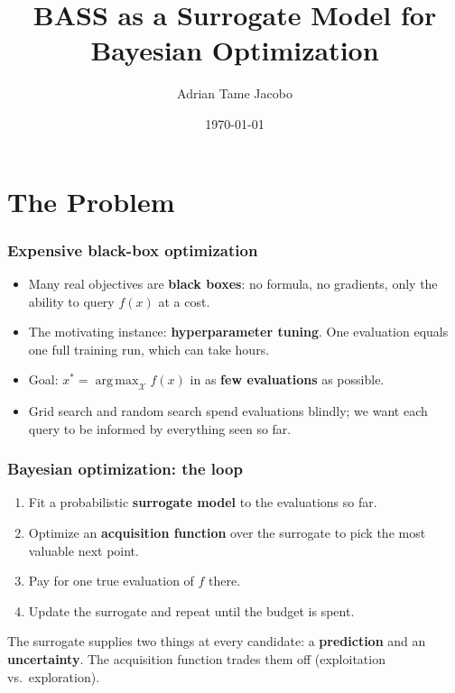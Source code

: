 \documentclass[fleqn]{beamer}
\title{BASS as a Surrogate Model for Bayesian Optimization}
\author{Adrian Tame Jacobo}
\institute[Instituto Tecnológico Autónomo de México]{Thesis Defense}
\date{\today}
\DeclareMathOperator*{\argmax}{arg\,max}
\begin{document}
\begin{frame}
  \titlepage
\end{frame}

\section{The Problem}

\begin{frame}
  \frametitle{Expensive black-box optimization}
  \begin{itemize}
    \item Many real objectives are \textbf{black boxes}: no formula, no gradients, only the ability to query $f(x)$ at a cost.
    \item The motivating instance: \textbf{hyperparameter tuning}. One evaluation equals one full training run, which can take hours.
    \item Goal: $x^* = \argmax_{\mathcal{X}} f(x)$ in as \textbf{few evaluations} as possible.
    \item Grid search and random search spend evaluations blindly; we want each query to be informed by everything seen so far.
  \end{itemize}
\end{frame}

\begin{frame}
  \frametitle{Bayesian optimization: the loop}
  \begin{enumerate}
    \item Fit a probabilistic \textbf{surrogate model} to the evaluations so far.
    \item Optimize an \textbf{acquisition function} over the surrogate to pick the most valuable next point.
    \item Pay for one true evaluation of $f$ there.
    \item Update the surrogate and repeat until the budget is spent.
  \end{enumerate}
  \vspace{2mm}
  The surrogate supplies two things at every candidate: a \textbf{prediction} and an \textbf{uncertainty}. The acquisition function trades them off (exploitation vs.\ exploration).
\end{frame}
\end{document}
